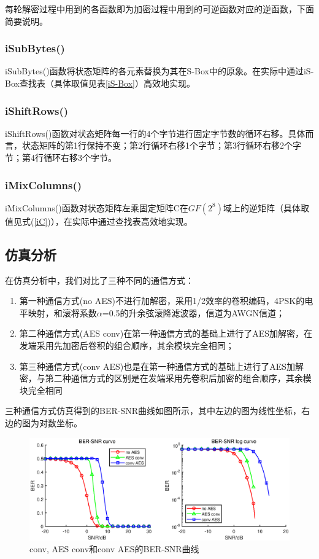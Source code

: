 每轮解密过程中用到的各函数即为加密过程中用到的可逆函数对应的逆函数，下面简要说明。

\subsubsection{iSubBytes()}

iSubBytes()函数将状态矩阵的各元素替换为其在S-Box中的原象。在实际中通过iS-Box查找表（具体取值见表\ref{iS-Box}）高效地实现。

\subsubsection{iShiftRows()}

iShiftRows()函数对状态矩阵每一行的4个字节进行固定字节数的循环右移。具体而言，状态矩阵的第1行保持不变；第2行循环右移1个字节；第3行循环右移2个字节；第4行循环右移3个字节。

\subsubsection{iMixColumns()}

iMixColumns()函数对状态矩阵左乘固定矩阵C在$GF(2^8)$域上的逆矩阵（具体取值见式(\ref{iC})），在实际中通过查找表高效地实现。

\subsection{仿真分析}

在仿真分析中，我们对比了三种不同的通信方式：

\begin{enumerate}
    \item 第一种通信方式(no AES)不进行加解密，采用1/2效率的卷积编码，4PSK的电平映射，和滚将系数$\alpha$=0.5的升余弦滚降滤波器，信道为AWGN信道；
    \item 第二种通信方式(AES conv)在第一种通信方式的基础上进行了AES加解密，在发端采用先加密后卷积的组合顺序，其余模块完全相同；
    \item 第三种通信方式(conv AES)也是在第一种通信方式的基础上进行了AES加解密，与第二种通信方式的区别是在发端采用先卷积后加密的组合顺序，其余模块完全相同
\end{enumerate}

三种通信方式仿真得到的BER-SNR曲线如图所示，其中左边的图为线性坐标，右边的图为对数坐标。

\begin{figure}[h]
    \centering
    \includegraphics[width=\textwidth]{./pic/AES_sim.eps}
    \caption{conv, AES conv和conv AES的BER-SNR曲线}
\end{figure}

